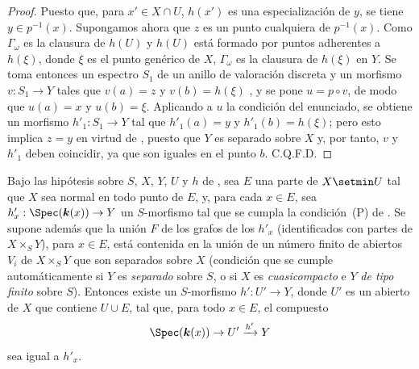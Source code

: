 \begin{proof}
Puesto que, para $x'\in X\cap U$, $h(x')$ es una especialización de $y$, se tiene $y\in p^{-1}(x)$.
Supongamos ahora que $z$ es un punto cualquiera de $p^{-1}(x)$.
Como $\Gamma_\omega$ es la clausura de $h(U)$ y $h(U)$ está formado por puntos adherentes a $h(\xi)$, donde $\xi$ es el punto genérico de $X$, $\Gamma_\omega$ es la clausura de $h(\xi)$ en $Y$.
Se toma entonces un espectro $S_1$ de un anillo de valoración discreta y un morfismo $v:S_1\to Y$ tales que $v(a)=z$ y $v(b)=h(\xi)$ , y se pone $u=p\circ v$, de modo que $u(a)=x$ y $u(b)=\xi$.
Aplicando a $u$ la condición del enunciado, se obtiene un morfismo $h'_1:S_1\to Y$ tal que $h'_1(a)=y$ y $h'_1(b)=h(\xi)$; pero esto implica $z=y$ en virtud de , puesto que $Y$ es separado sobre $X$ y, por tanto, $v$ y $h'_1$ deben coincidir, ya que son iguales en el punto $b$.
C.Q.F.D.
\end{proof}

\begin{corollary}[20.4.7]
\label{IV.20.4.7}
Bajo las hipótesis sobre $S$, $X$, $Y$, $U$ y $h$ de , sea $E$ una parte de $X\setmin U$ tal que $X$ sea \textup{normal} en todo punto de $E$, y, para cada $x\in E$, sea $h'_x:\Spec(\boldsymbol{k}(x))\to Y$ un $S$-morfismo tal que se cumpla la condición~\textup{(P)} de .
Se supone además que la unión $F$ de los grafos de los $h'_x$ (identificados con partes de $X\times_S Y$), para $x\in E$, está contenida en la unión de un número \textup{finito} de abiertos $V_i$ de $X\times_S Y$ que son separados sobre $X$ \textup{(condición que se cumple automáticamente si $Y$ es \emph{separado} sobre $S$, o si $X$ es \emph{cuasicompacto} e $Y$ \emph{de tipo finito} sobre $S$)}.
Entonces existe un $S$-morfismo $h':U'\to Y$, donde $U'$ es un abierto de $X$ que contiene $U\cup E$, tal que, para todo $x\in E$, el compuesto
\[
  \Spec(\boldsymbol{k}(x))\to U'\xrightarrow{h'}Y
\]
sea igual a $h'_x$.
\end{corollary}

